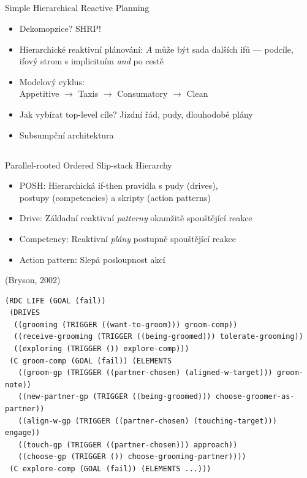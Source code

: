 \documentclass{beamer}
\begin{document}
\subsection{}
\begin{frame}{Simple Hierarchical Reactive Planning}
\begin{itemize}
\item Dekomopzice? SHRP!
\item Hierarchické reaktivní plánování:
	$A$ může být sada dalších ifů --- podcíle,
	ifový strom s implicitním {\em and} po cestě
\item Modelový cyklus: \\ Appetitive $\to$ Taxis $\to$ Consumatory $\to$ Clean
\item Jak vybírat top-level cíle? Jízdní řád, pudy, dlouhodobé plány
\item Subsumpční architektura
\end{itemize}
\end{frame}

\subsection{}
\begin{frame}[fragile]{Parallel-rooted Ordered Slip-stack Hierarchy}
\begin{itemize}
\item POSH: Hierarchická if-then pravidla s pudy (drives), \\ postupy (competencies) a skripty (action patterns)
\item Drive: Základní reaktivní {\em patterny} okamžitě spouštějící reakce
\item Competency: Reaktivní {\em plány} postupně spouštějící reakce
\item Action pattern: Slepá posloupnost akcí
\end{itemize}

\hfill {\tiny (Bryson, 2002)}
\begin{lstlisting}
(RDC LIFE (GOAL (fail))
 (DRIVES
  ((grooming (TRIGGER ((want-to-groom))) groom-comp))
  ((receive-grooming (TRIGGER ((being-groomed))) tolerate-grooming))
  ((exploring (TRIGGER ()) explore-comp)))
 (C groom-comp (GOAL (fail)) (ELEMENTS
   ((groom-gp (TRIGGER ((partner-chosen) (aligned-w-target))) groom-note))
   ((new-partner-gp (TRIGGER ((being-groomed))) choose-groomer-as-partner))
   ((align-w-gp (TRIGGER ((partner-chosen) (touching-target))) engage))
   ((touch-gp (TRIGGER ((partner-chosen))) approach))
   ((choose-gp (TRIGGER ()) choose-grooming-partner))))
 (C explore-comp (GOAL (fail)) (ELEMENTS ...)))
\end{lstlisting}
\end{frame}
\end{document}
